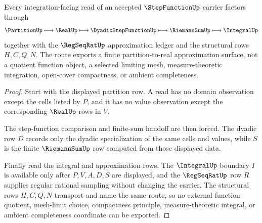 \begin{theorem}
\label{thm:step-function-partition-integral-route}
Every integration-facing read of an accepted $\StepFunctionUp$ carrier factors through
$$
\PartitionUp \longmapsto \RealUp \longmapsto \DyadicStepFunctionUp \longmapsto \RiemannSumUp \longmapsto \IntegralUp
$$
together with the $\RegSeqRatUp$ approximation ledger and the structural rows $H,C,Q,N$. The route exports a finite partition-to-real approximation surface, not a quotient function object, a selected limiting mesh, measure-theoretic integration, open-cover compactness, or ambient completeness.
\end{theorem}
\begin{proof}
Start with the displayed partition row. A read has no domain observation except the cells listed by $P$, and it has no value observation except the corresponding $\RealUp$ rows in $V$.

The step-function comparison and finite-sum handoff are then forced. The dyadic row $D$ records only the dyadic specialization of the same cells and values, while $S$ is the finite $\RiemannSumUp$ row computed from those displayed data.

Finally read the integral and approximation rows. The $\IntegralUp$ boundary $I$ is available only after $P,V,A,D,S$ are displayed, and the $\RegSeqRatUp$ row $R$ supplies regular rational sampling without changing the carrier. The structural rows $H,C,Q,N$ transport and name the same route, so no external function quotient, mesh-limit choice, compactness principle, measure-theoretic integral, or ambient completeness coordinate can be exported.
\end{proof}




